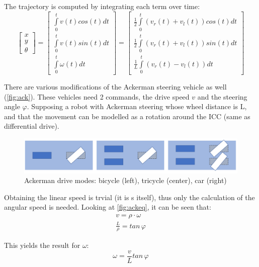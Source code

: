 The trajectory is computed by integrating each term over time:
\begin{equation}
  \begin{bmatrix} x \\ y \\ \theta \end{bmatrix} = 
    \begin{bmatrix} \int\limits_0^t v(t) cos(t) dt\\ \int\limits_0^t v(t) sin(t) dt \\ \int\limits_0^t\omega(t)dt \end{bmatrix} = 
    \begin{bmatrix} \frac{1}{2}\!\int\limits_0^t (v_r(t)+v_l(t)) cos(t) dt\\ \frac{1}{2}\!\int\limits_0^t (v_r(t)+v_l(t)) sin(t) dt \\ \frac{1}{L}\!\int\limits_0^t(v_r(t) - v_l(t))dt \end{bmatrix}
\end{equation}  


There are various modifications of the Ackerman steering vehicle as well (\autoref{fig:ack}). These vehicles need 2 commands, the drive speed $v$ and the steering angle $\varphi$. Supposing a robot with Ackerman steering whose wheel distance is L, and that the movement can be modelled as a rotation around the ICC (same as differential drive).

\begin{figure}[htb]
  \centering
  \includegraphics[width=\linewidth]{pictures/02/ack}
  \caption[Ackermann drive modes]{Ackerman drive modes: bicycle (left), tricycle (center), car (right)}
  \label{fig:ack}
\end{figure}

Obtaining the linear speed is trvial (it is s itself), thus only the calculation of the angular speed is needed. Looking at \autoref{fig:ackeq}, it can be seen that:
\begin{gather}
  v = \rho\cdot\omega \\
  \frac{L}{\rho} = tan\,\varphi
\end{gather}  

This yields the result for $\omega$:
\begin{equation}
  \omega = \frac{v}{L}tan\,\varphi
\end{equation} 

